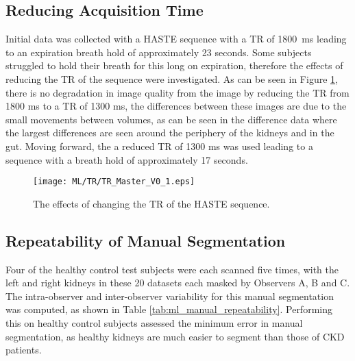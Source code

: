 \subsection{Reducing Acquisition Time}
Initial data was collected with a \ac{HASTE} sequence with a \ac{TR} of 1800~ms leading to an expiration breath hold of approximately 23 seconds. Some subjects struggled to hold their breath for this long on expiration, therefore the effects of reducing the \ac{TR} of the sequence were investigated. As can be seen in Figure \ref{fig:ml_tr}, there is no degradation in image quality from the image by reducing the \ac{TR} from 1800 ms to a \ac{TR} of 1300 ms, the differences between these images are due to the small movements between volumes, as can be seen in the difference data where the largest differences are seen around the periphery of the kidneys and in the gut. Moving forward, the a reduced \ac{TR} of 1300 ms was used leading to a sequence with a breath hold of approximately 17 seconds.

\begin{figure}[H]
	\centering
	\texttt{[image: ML/TR/TR\_Master\_V0\_1.eps]}
	\caption{The effects of changing the \ac{TR} of the \ac{HASTE} sequence.}
	\label{fig:ml_tr}	
\end{figure}

\subsection{Repeatability of Manual Segmentation}
Four of the healthy control test subjects were each scanned five times, with the left and right kidneys in these 20 datasets each masked by Observers A, B and C. The intra-observer and inter-observer variability for this manual segmentation was computed, as shown in Table \ref{tab:ml_manual_repeatability}. Performing this on healthy control subjects assessed the minimum error in manual segmentation, as healthy kidneys are much easier to segment than those of \ac{CKD} patients.

